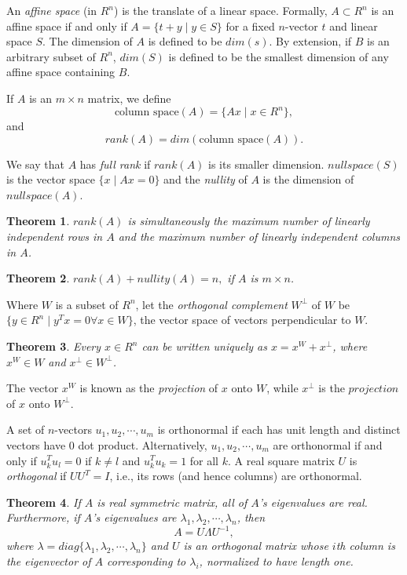 \documentclass[11pt]{article} %
\theoremstyle{plain}%
\newtheorem{thm}{Theorem}[section]
\theoremstyle{definition}
\theoremstyle{remark}
\begin{document}
An \emph{affine space} (in $R^n$) is the translate of a linear space. Formally, 
$A \subset R^n$ is an affine space if and only if $A = \{ t + y \mid y \in S \}$ 
for a fixed $n$-vector $t$ and linear space $S$. The dimension of $A$ is defined 
to be $dim(s)$. By extension, if $B$ is an arbitrary subset of $R^n$, $dim(S)$ 
is defined to be the smallest dimension of any affine space containing $B$. 

If $A$ is an $m\times n$ matrix, we define 
$$\text{column space} (A) = \{ Ax \mid x \in R^n\}, $$
and 
$$ rank(A) = dim(\text{column space} (A)). $$

We say that $A$ has \emph{full rank} if $rank(A)$ is its smaller dimension. 
$nullspace(S)$ is the vector space $\{ x \mid Ax = 0 \}$ and the \emph{nullity} 
of $A$ is the dimension of $nullspace(A)$. 

\begin{thm}
$rank(A)$ is simultaneously the maximum number of linearly independent rows in $A$
and the maximum number of linearly independent columns in $A$. 
\end{thm}

\begin{thm}
$rank(A) + nullity(A) = n,$ if $A$ is $m\times n$.
\end{thm}

Where $W$ is a subset of $R^n$, let the \emph{orthogonal complement} 
$W^{\perp}$ of $W$ be $\{ y \in R^n \mid y^T x = 0 \forall x \in W \}$, 
the vector space of vectors perpendicular to $W$. 

\begin{thm}
Every $x \in R^n$ can be written uniquely as $x = x^W + x^{\perp}$, where 
$x^W \in W$ and $x^{\perp} \in W^{\perp}$. 
\end{thm}

The vector $x^W$ is known as the \emph{projection} of $x$ onto $W$, while 
$x^{\perp}$ is the $projection$ of $x$ onto $W^{\perp}$. 

A set of $n$-vectors $u_1, u_2, \cdots, u_m$ is orthonormal if each has unit 
length and distinct vectors have $0$ dot product. Alternatively, 
$u_1, u_2, \cdots, u_m$ are orthonormal if and only if $u^T_k u_l = 0$ 
if $k\neq l$ and $u^T_k u_k = 1$ for all $k$. A real square matrix $U$ is 
\emph{orthogonal} if $UU^T = I$, i.e., its rows (and hence columns) are 
orthonormal. 

\begin{thm}
If $A$ is real symmetric matrix, all of $A$'s eigenvalues are real. Furthermore, 
if $A$'s eigenvalues are $\lambda_1, \lambda_2, \cdots, \lambda_n$, then 
$$ A = U \Lambda U^{-1}, $$
where $ \lambda = diag\{ \lambda_1, \lambda_2, \cdots, \lambda_n\}$ and
$U$ is an orthogonal matrix whose $i$th column is the eigenvector of $A$ 
corresponding to $\lambda_i$, normalized to have length one. 
\end{thm}
\end{document}
